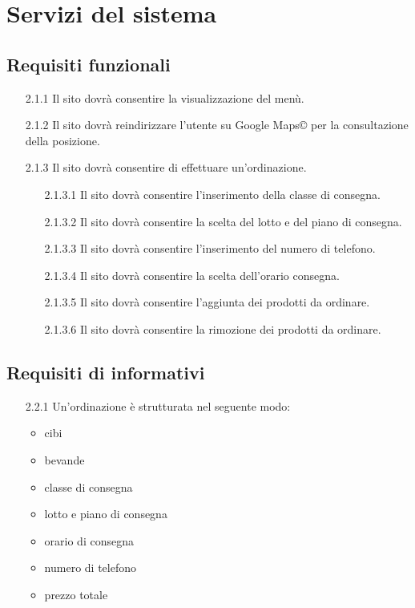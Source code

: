 \documentclass[a4paper,11pt]{article}       %
\begin{document}
    
\section{Servizi del sistema}
    \subsection{Requisiti funzionali}
        \begin{itemize}
            \item[2.1.1] Il sito dovrà consentire la visualizzazione del menù.
            \item[2.1.2] Il sito dovrà reindirizzare l'utente su Google Maps© per la consultazione della posizione.
            \item[2.1.3] Il sito dovrà consentire di effettuare un'ordinazione.
                \begin{itemize}
                    \item[2.1.3.1] Il sito dovrà consentire l'inserimento della classe di consegna.
                    \item[2.1.3.2] Il sito dovrà consentire la scelta del lotto e del piano di consegna.
                    \item[2.1.3.3] Il sito dovrà consentire l'inserimento del numero di telefono.
                    \item[2.1.3.4] Il sito dovrà consentire la scelta dell'orario consegna.
                    \item[2.1.3.5] Il sito dovrà consentire l'aggiunta dei prodotti da ordinare.
                    \item[2.1.3.6] Il sito dovrà consentire la rimozione dei prodotti da ordinare.
                \end{itemize}
        \end{itemize}
    
    \subsection{Requisiti di informativi}
        \begin{itemize}
            \item [2.2.1] Un'ordinazione è strutturata nel seguente modo:
                \begin{itemize}
                    \item cibi
                    \item bevande
                    \item classe di consegna
                    \item lotto e piano di consegna
                    \item orario di consegna
                    \item numero di telefono
                    \item prezzo totale
                \end{itemize}
        \end{itemize}
\end{document}
